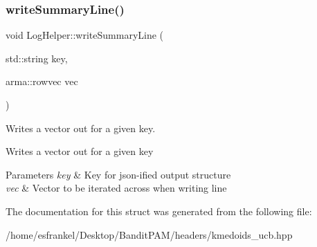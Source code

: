 \subsubsection{\texorpdfstring{write\+Summary\+Line()}{writeSummaryLine()}}
{\footnotesize\ttfamily void Log\+Helper\+::write\+Summary\+Line (\begin{DoxyParamCaption}\item[{std\+::string}]{key,  }\item[{arma\+::rowvec}]{vec }\end{DoxyParamCaption})\hspace{0.3cm}{\ttfamily [inline]}}



Writes a vector out for a given key. 

Writes a vector out for a given key


\begin{DoxyParams}{Parameters}
{\em key} & Key for json-\/ified output structure \\
\hline
{\em vec} & Vector to be iterated across when writing line \\
\hline
\end{DoxyParams}


The documentation for this struct was generated from the following file\+:\begin{DoxyCompactItemize}
\item 
/home/esfrankel/\+Desktop/\+Bandit\+P\+A\+M/headers/kmedoids\+\_\+ucb.\+hpp\end{DoxyCompactItemize}
